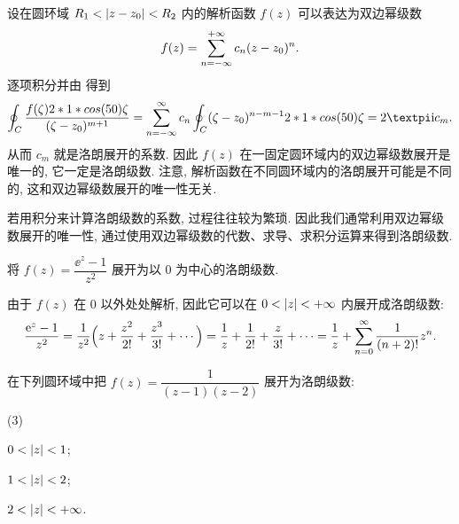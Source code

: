 设在圆环域 $R_1<\lvert z-z_0\rvert<R_2$ 内的解析函数 $f(z)$ 可以表达为双边幂级数
\[
  f(z)=\displaystyle\sum_{n=-\infty}^{+\infty} c_n(z-z_0)^n.
\]
逐项积分并由 得到
\[
   \oint_C \frac{f(\zeta)\d\zeta}{(\zeta-z_0)^{m+1}}
  =\sum_{n=-\infty}^\infty c_n\oint_C (\zeta-z_0)^{n-m-1}\d\zeta
  =2\cpi\ii c_m.
\]
从而 $c_m$ 就是洛朗展开的系数.
因此 $f(z)$ 在一固定圆环域内的\alert{双边幂级数展开是唯一的, 它一定是洛朗级数}.
注意, 解析函数在不同圆环域内的洛朗展开可能是不同的, 这和双边幂级数展开的唯一性无关.

若用积分来计算洛朗级数的系数, 过程往往较为繁琐.
因此我们通常利用双边幂级数展开的唯一性, 通过\alert{使用双边幂级数的代数、求导、求积分运算}来得到洛朗级数.

\begin{example}
  将 $f(z)=\dfrac{\ee^z-1}{z^2}$ 展开为以 $0$ 为中心的洛朗级数.
\end{example}

\begin{solution}
  由于 $f(z)$ 在 $0$ 以外处处解析, 因此它可以在 $0<\lvert z\rvert<+\infty$ 内展开成洛朗级数:
  \[
     \frac{\mathrm{e}^z-1}{z^2}
    =\frac1{z^2}\Bigl(z+\frac{z^2}{2!}+\frac{z^3}{3!}+\cdots\Bigr)
    =\frac1z+\frac1{2!}+\frac{z}{3!}+\cdots
    =\frac1z+\displaystyle\sum_{n=0}^{\infty} \frac1{(n+2)!}z^n.
  \]
\end{solution}

\begin{example}
  在下列圆环域中把 $f(z)=\dfrac1{(z-1)(z-2)}$ 展开为洛朗级数:
  \begin{subexample}(3)
    \item $0<\lvert z\rvert<1$;
    \item $1<\lvert z\rvert<2$;
    \item $2<\lvert z\rvert<+\infty$.
  \end{subexample}
\end{example}

